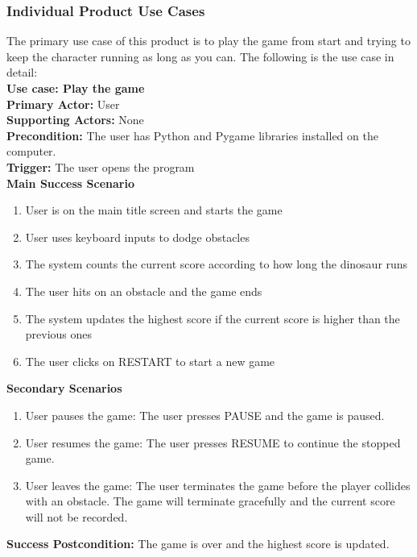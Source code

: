 \documentclass[12pt, titlepage]{article}
\begin{document}
\subsubsection{Individual Product Use Cases}
The primary use case of this product is to play the game from start and trying to keep the character running as long as you can. The following is the use case in detail:\\\newline
\textbf{Use case: Play the game}\\
\textbf{Primary Actor:} User\\
\textbf{Supporting Actors:} None\\
\textbf{Precondition:} The user has Python and Pygame libraries installed on the computer.\\
\textbf{Trigger:} The user opens the program\\
\textbf{Main Success Scenario}
\begin{enumerate}
    \item User is on the main title screen and starts the game
    \item User uses keyboard inputs to dodge obstacles
    \item The system counts the current score according to how long the dinosaur runs
    \item The user hits on an obstacle and the game ends
    \item The system updates the highest score if the current score is higher than the previous ones
    \item The user clicks on RESTART to start a new game
\end{enumerate}
\textbf{Secondary Scenarios}
\begin{enumerate}
    \item User pauses the game: The user presses PAUSE and the game is paused.
    \item User resumes the game: The user presses RESUME to continue the stopped game. 
    \item User leaves the game: The user terminates the game before the player collides with an obstacle. The game will terminate gracefully and the current score will not be recorded.
\end{enumerate}
\textbf{Success Postcondition:} The game is over and the highest score is updated.
\end{document}
